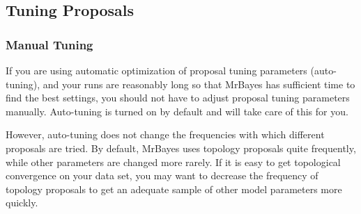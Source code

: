 \documentclass[12pt]{book}
\newcommand{\ttt}[1]{\texttt{#1}}
\newcommand{\tb}[1]{\ttt{\textbf{#1}}}
\begin{document}

\subsection{Tuning Proposals}

\subsubsection{Manual Tuning}
If you are using automatic optimization of proposal tuning parameters (auto-tuning), and your runs
are reasonably long so that MrBayes has sufficient time to find the best settings, you should not
have to adjust proposal tuning parameters manually. Auto-tuning is turned on by default and will
take care of this for you.

However, auto-tuning does not change the frequencies with which different proposals are tried. By
default, MrBayes uses topology proposals quite frequently, while other parameters are changed more
rarely. If it is easy to get topological convergence on your data set, you may want to decrease the
frequency of topology proposals to get an adequate sample of other model parameters more quickly.
\end{document}
